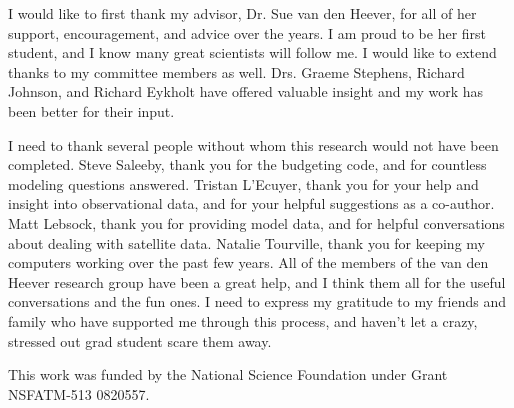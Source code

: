 \begin{acknowledgements}   %

I would like to first thank my advisor, Dr. Sue van den Heever, for all of her support, encouragement, and advice over the years.  I am proud to be her first student, and I know many great scientists will follow me.  I would like to extend thanks to my committee members as well.  Drs. Graeme Stephens, Richard Johnson, and Richard Eykholt have offered valuable insight and my work has been better for their input.

I need to thank several people without whom this research would not have been completed.  Steve Saleeby, thank you for the budgeting code, and for countless modeling questions answered.  Tristan L'Ecuyer, thank you for your help and insight into observational data, and for your helpful suggestions as a co-author.  Matt Lebsock, thank you for providing model data, and for helpful conversations about dealing with satellite data.  Natalie Tourville, thank you for keeping my computers working over the past few years.  All of the members of the van den Heever research group have been a great help, and I think them all for the useful conversations and the fun ones.  I need to express my gratitude to my friends and family who have supported me through this process, and haven't let a crazy, stressed out grad student scare them away.

  This work was funded by the National Science Foundation under Grant NSFATM-513 0820557.
\end{acknowledgements}
